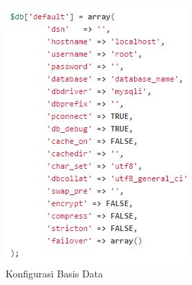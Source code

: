 		\begin{figure}[H]
			\centering
			\includegraphics[scale=1]{Gambar/database}
			\caption{Konfigurasi Basis Data}
			\label{fig:database}
		\end{figure}
		

